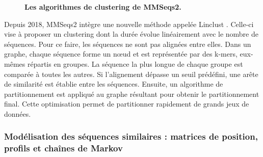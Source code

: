 \begin{figure}[htbp]
    \centering
    \hfill
    \hfill
    \caption[Algorithmes de clustering de MMSeqs2]{\textbf{Les algorithmes de clustering de MMSeqs2.}}
    \label{fig:mmclust}
\end{figure}

\newpage

Depuis 2018, MMSeqs2 intègre une nouvelle méthode appelée Linclust \cite{steinegger_clustering_2018}. Celle-ci vise à proposer un clustering dont la durée évolue linéairement avec le nombre de séquences. Pour ce faire, les séquences ne sont pas alignées entre elles. Dans un graphe, chaque séquence forme un n\oe ud et est représentée par des k-mers, eux-mêmes répartis en groupes. La séquence la plus longue de chaque groupe est comparée à toutes les autres. Si l'alignement dépasse un seuil prédéfini, une arête de similarité est établie entre les séquences. Ensuite, un algorithme de partitionnement est appliqué au graphe résultant pour obtenir le partitionnement final. Cette optimisation permet de partitionner rapidement de grands jeux de données.

\subsubsection{Modélisation des séquences similaires : matrices de position, profils et chaînes de Markov}

